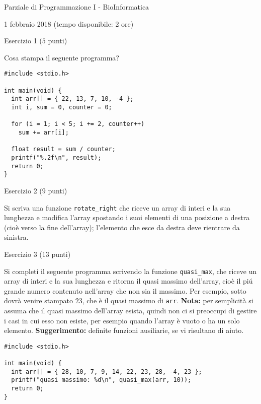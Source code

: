 \documentclass[12pt]{article}
\begin{document}
\begin{center}{\LARGE Parziale di Programmazione I - BioInformatica}\\
\vspace*{-2ex}
\begin{center}
  \large 1 febbraio 2018 (tempo disponibile: 2 ore)
\end{center}
\end{center}

\begin{center}{\Large Esercizio 1} ($5$ punti)
\end{center}

Cosa stampa il seguente programma?

\begin{lstlisting}
#include <stdio.h>

int main(void) {
  int arr[] = { 22, 13, 7, 10, -4 };
  int i, sum = 0, counter = 0;

  for (i = 1; i < 5; i += 2, counter++)
    sum += arr[i];

  float result = sum / counter;
  printf("%.2f\n", result);
  return 0;
}
\end{lstlisting}

\vspace*{1ex}
\begin{center}{\Large Esercizio 2} ($9$ punti)
\end{center}
Si scriva una funzione \texttt{rotate\_right} che riceve un array di interi e la sua lunghezza e modifica l'array spostando i suoi elementi di una posizione a destra (cio\`e verso la fine dell'array); l'elemento che esce da destra deve rientrare da sinistra.

\vspace*{1ex}
\begin{center}{\Large Esercizio 3} ($13$ punti)\end{center}
%
Si completi il seguente programma scrivendo la funzione
\texttt{quasi\_max}, che riceve un array di interi e la sua lunghezza
e ritorna il quasi massimo dell'array, cio\`e il pi\'u grande numero
contenuto nell'array che non sia il massimo. Per esempio, sotto
dovr\`a venire stampato $23$, che \`e il quasi massimo di \texttt{arr}.
\textbf{Nota:} per semplicit\`a
si assuma che il quasi massimo dell'array
esista, quindi non ci si preoccupi di gestire i casi in cui
esso non esiste, per esempio quando l'array \`e vuoto
o ha un solo elemento. \textbf{Suggerimento:} definite funzioni
ausiliarie, se vi risultano di aiuto.
%
\begin{lstlisting}
#include <stdio.h>

int main(void) {
  int arr[] = { 28, 10, 7, 9, 14, 22, 23, 28, -4, 23 };
  printf("quasi massimo: %d\n", quasi_max(arr, 10));
  return 0;
}
\end{lstlisting}
\end{document}
